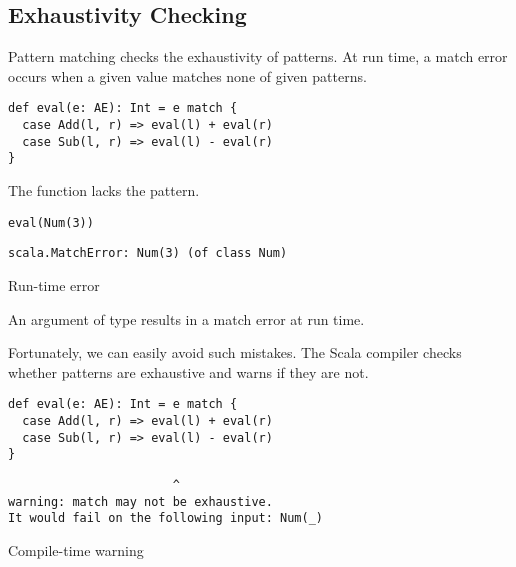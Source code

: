 \subsection{Exhaustivity Checking}

Pattern matching checks the exhaustivity of patterns. At run time, a match error
occurs when a given value matches none of given patterns.

\begin{verbatim}
def eval(e: AE): Int = e match {
  case Add(l, r) => eval(l) + eval(r)
  case Sub(l, r) => eval(l) - eval(r)
}
\end{verbatim}

The function lacks the  pattern.

\begin{verbatim}
eval(Num(3))
\end{verbatim}
\vspace{-1em}
\begin{mdframed}[hidealllines=true,backgroundcolor=red!10,innerleftmargin=3pt,innerrightmargin=3pt,leftmargin=-3pt,rightmargin=-3pt]
\begin{verbatim}
scala.MatchError: Num(3) (of class Num)
\end{verbatim}
\vspace{-2em}
\begin{flushright}
\scriptsize\textsf{Run-time error}
\end{flushright}
\end{mdframed}

An argument of type  results in a match error at run time.

Fortunately, we can easily avoid such mistakes.
The Scala compiler checks whether patterns are exhaustive and warns if they are not.

\begin{verbatim}
def eval(e: AE): Int = e match {
  case Add(l, r) => eval(l) + eval(r)
  case Sub(l, r) => eval(l) - eval(r)
}
\end{verbatim}
\vspace{-1em}
\begin{mdframed}[hidealllines=true,backgroundcolor=yellow!10,innerleftmargin=3pt,innerrightmargin=3pt,leftmargin=-3pt,rightmargin=-3pt]
\begin{verbatim}
                       ^
warning: match may not be exhaustive.
It would fail on the following input: Num(_)
\end{verbatim}
\vspace{-2em}
\begin{flushright}
\scriptsize\textsf{Compile-time warning}
\end{flushright}
\end{mdframed}

